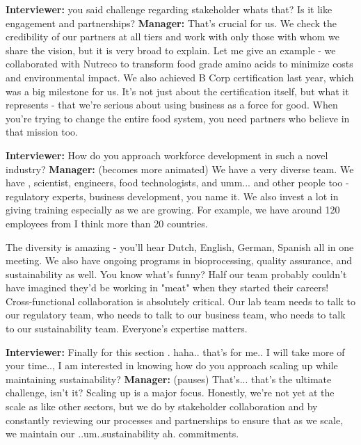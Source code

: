 \textbf{Interviewer:} you said challenge regarding stakeholder whats that? Is it like engagement and partnerships? \newline
\textbf{Manager:} That's crucial for us. We check the credibility of our partners at all tiers and work with only those with whom we share the vision, but it is very broad to explain. Let me give an example - we collaborated with Nutreco to transform food grade amino acids to minimize costs and environmental impact. \newline
We also achieved B Corp certification last year, which was a big milestone for us. It's not just about the certification itself, but what it represents - that we're serious about using business as a force for good. When you're trying to change the entire food system, you need partners who believe in that mission too. \newline

\textbf{Interviewer:} How do you approach workforce development in such a novel industry? \newline
\textbf{Manager:} (becomes more animated) We have a very diverse team. We have  , scientist, engineers, food technologists, and umm... and other people too - regulatory experts, business development, you name it. We also invest a lot in giving training especially as we are growing. For example, we have around 120 employees from I think more than 20 countries.\newline

The diversity is amazing - you'll hear Dutch, English, German, Spanish all in one meeting. We also have ongoing programs in bioprocessing, quality assurance, and sustainability as well. You know what's funny? Half our team probably couldn't have imagined they'd be working in "meat" when they started their careers!  \newline
Cross-functional collaboration is absolutely critical. Our lab team needs to talk to our regulatory team, who needs to talk to our business team, who needs to talk to our sustainability team. Everyone's expertise matters.\newline

\textbf{Interviewer:} Finally for this section . haha.. that's for me.. I will take more of your time.., I am interested in knowing how do you approach scaling up while maintaining sustainability? \newline
\textbf{Manager:} (pauses) That's... that's the ultimate challenge, isn't it? Scaling up is a major focus.  Honestly, we're not yet at the scale as like other sectors, but we do by stakeholder collaboration and by constantly reviewing our processes and partnerships to ensure that as we scale, we maintain our ..um..sustainability ah. commitments.  \newline

